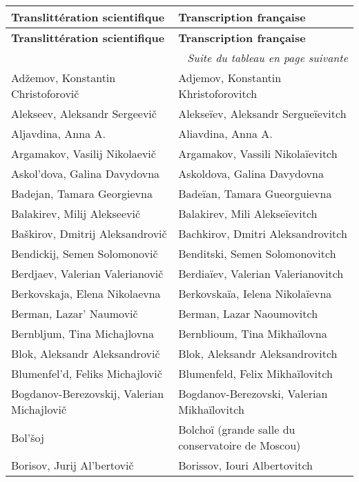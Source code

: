 \setlongtables
{\fontsize{9}{12pt}\selectfont
{}\label{tab:Correspondance}
\begin{longtable}[c]{ll}
 \toprule
 \multicolumn{1}{l}{\textbf{Translittération scientifique}}
 & \multicolumn{1}{l}{\textbf{Transcription française}}
 \\ \midrule
 \endfirsthead
 \midrule
 \multicolumn{1}{l}{\textbf{Translittération scientifique}}
 & \multicolumn{1}{l}{\textbf{Transcription française}}
 \\ \midrule
 \endhead
 \midrule
 \multicolumn{2}{r}{\textit{Suite du tableau en page suivante}}
 \\ \midrule
 \endfoot
 \bottomrule
 \endlastfoot
 Adžemov, Konstantin Christoforovič
 & Adjemov, Konstantin Khristoforovitch
 \\
 Alekseev, Aleksandr Sergeevič
 & Alekseïev, Aleksandr Sergueïevitch
 \\
 Aljavdina, Anna A.
 & Aliavdina, Anna A.
 \\
 Argamakov, Vasilij Nikolaevič
 & Argamakov, Vassili Nikolaïevitch
 \\
 Askol'dova, Galina Davydovna
 & Askoldova, Galina Davydovna
 \\
 Badejan, Tamara Georgievna
 & Badeïan, Tamara Gueorguievna
 \\
 Balakirev, Milij Alekseevič
 & Balakirev, Mili Alekseïevitch
 \\
 Baškirov, Dmitrij Aleksandrovič
 & Bachkirov, Dmitri Aleksandrovitch
 \\
 Bendickij, Semen Solomonovič
 & Benditski, Semen Solomonovitch
 \\
 Berdjaev, Valerian Valerianovič
 & Berdiaïev, Valerian Valerianovitch
 \\
 Berkovskaja, Elena Nikolaevna
 & Berkovskaïa, Ielena Nikolaïevna
 \\
 Berman, Lazar' Naumovič
 & Berman, Lazar Naoumovitch
 \\
 Bernbljum, Tina Michajlovna
 & Bernblioum, Tina Mikhaïlovna
 \\
 Blok, Aleksandr Aleksandrovič
 & Blok, Aleksandr Aleksandrovitch
 \\
 Blumenfel'd, Feliks Michajlovič
 & Blumenfeld, Felix Mikhaïlovitch
 \\
 Bogdanov-Berezovskij, Valerian Michajlovič
 & Bogdanov-Berezovski, Valerian Mikhaïlovitch
 \\
 Bol'šoj
 & Bolchoï (grande salle du conservatoire de Moscou)
 \\
 Borisov, Jurij Al'bertovič
 & Borissov, Iouri Albertovitch

\end{longtable}}
